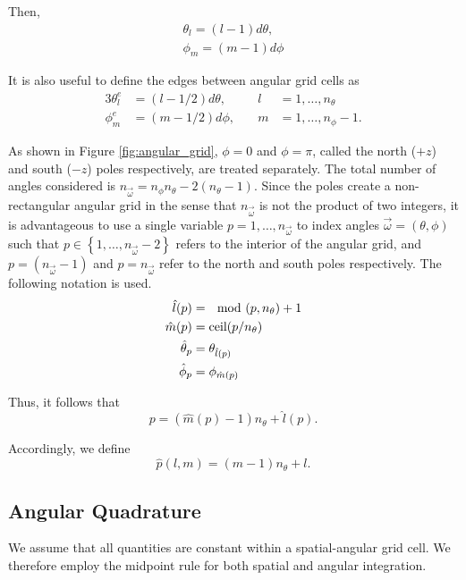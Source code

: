 Then,
\begin{align}
  \theta_l = (l-1) d\theta, \\
  \phi_m = (m-1) d\phi
\end{align}

It is also useful to define the edges between angular grid cells as
\begin{alignat}{3}
  \theta_l^e &= (l-1/2) d\theta, &\quad l&=1,\ldots,n_\theta \\
  \phi_m^e &= (m-1/2) d\phi, &\quad m&=1,\ldots,n_\phi-1.
\end{alignat}


As shown in Figure \ref{fig:angular_grid}, $\phi=0$ and $\phi=\pi$, called
the north ($+z$) and south ($-z$) poles respectively, are treated separately.
The total number of angles considered is $n_{\vec{\omega}} = n_\phi n_\theta -
2(n_\theta-1)$.
Since the poles create a non-rectangular angular grid in the sense that
$n_{\vec{\omega}}$ is not the product of two integers, it is advantageous to use
a single variable $p=1,\ldots,n_{\vec{\omega}}$ to index angles $\vec{\omega} =
(\theta, \phi)$ such that $p \in \left\{ 1,\ldots,n_{\vec{\omega}}-2 \right\}$ refers to the interior
of the angular grid, and $p=\left( n_{\vec{\omega}}-1\right)$ and $p=n_{\vec{\omega}}$ refer to the
north and south poles respectively.
The following notation is used.
\begin{align}
  \hat{l}(p) &= \mod(p, n_\theta) + 1 \\
  \hat{m}(p) &= \mbox{ceil}(p/n_\theta) \\
  \hat{\theta}_p &= \theta_{\hat{l}(p)} \\
  \hat{\phi}_p &= \phi_{\hat{m}(p)}
\end{align}

Thus, it follows that
\begin{equation}
  p = \left( \hat{m}(p)-1\right)n_\theta + \hat{l}(p).
\end{equation}

Accordingly, we define
\begin{equation}
  \hat{p}(l,m) = (m-1)n_\theta + l.
\end{equation}

\subsection{Angular Quadrature}
We assume that all quantities are constant within a spatial-angular grid cell.
We therefore employ the midpoint rule for both spatial and angular integration.

